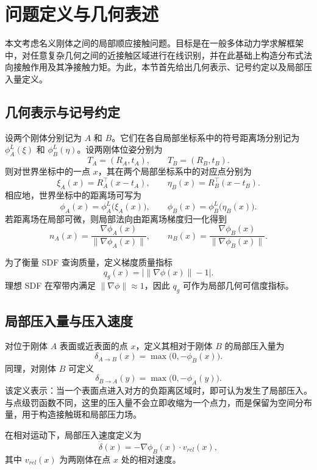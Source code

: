 \section{问题定义与几何表述}
本文考虑名义刚体之间的局部顺应接触问题。目标是在一般多体动力学求解框架中，对任意复杂几何之间的近接触区域进行在线识别，并在此基础上构造分布式法向接触作用及其净接触力矩。为此，本节首先给出几何表示、记号约定以及局部压入量定义。

\subsection{几何表示与记号约定}
设两个刚体分别记为 $A$ 和 $B$。它们在各自局部坐标系中的符号距离场分别记为 $\phi_A^L(\xi)$ 和 $\phi_B^L(\eta)$。设两刚体位姿分别为
\begin{equation}
T_A=(R_A,t_A),\qquad T_B=(R_B,t_B).
\end{equation}
则对世界坐标中的一点 $x$，其在两个局部坐标系中的对应点分别为
\begin{equation}
\xi_A(x)=R_A^\top (x-t_A),\qquad \eta_B(x)=R_B^\top (x-t_B).
\end{equation}
相应地，世界坐标中的距离场可写为
\begin{equation}
\phi_A(x)=\phi_A^L\big(\xi_A(x)\big),\qquad \phi_B(x)=\phi_B^L\big(\eta_B(x)\big).
\end{equation}
若距离场在局部可微，则局部法向由距离场梯度归一化得到
\begin{equation}
n_A(x)=\frac{\nabla \phi_A(x)}{\|\nabla \phi_A(x)\|},\qquad
n_B(x)=\frac{\nabla \phi_B(x)}{\|\nabla \phi_B(x)\|}.
\end{equation}

为了衡量 SDF 查询质量，定义梯度质量指标
\begin{equation}
q_g(x)=\left|\|\nabla \phi(x)\|-1\right|.
\end{equation}
理想 SDF 在窄带内满足 $\|\nabla \phi\|\approx 1$，因此 $q_g$ 可作为局部几何可信度指标。

\subsection{局部压入量与压入速度}
对位于刚体 $A$ 表面或近表面的点 $x$，定义其相对于刚体 $B$ 的局部压入量为
\begin{equation}
\delta_{A\rightarrow B}(x)=\max\bigl(0,-\phi_B(x)\bigr).
\end{equation}
同理，对刚体 $B$ 可定义
\begin{equation}
\delta_{B\rightarrow A}(y)=\max\bigl(0,-\phi_A(y)\bigr).
\end{equation}
该定义表示：当一个表面点进入对方的负距离区域时，即可认为发生了局部压入。与点级罚函数不同，这里的压入量不会立即收缩为一个点力，而是保留为空间分布量，用于构造接触斑和局部压力场。

在相对运动下，局部压入速度定义为
\begin{equation}
\dot{\delta}(x)=-\nabla \phi_B(x)\cdot v_{rel}(x),
\end{equation}
其中 $v_{rel}(x)$ 为两刚体在点 $x$ 处的相对速度。
